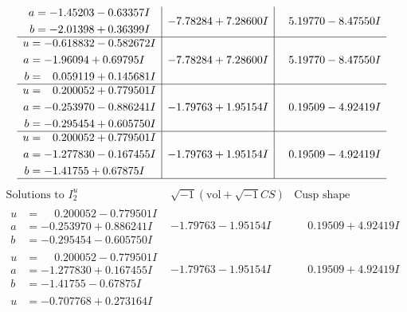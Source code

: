 \documentclass[1p]{elsarticle_modified}
\theoremstyle{definition}
\newcommand{\I}{\sqrt{-1}}
\begin{document}
$$\begin{array}{c|c|c}
\begin{aligned}
a &= -1.45203 - 0.63357 I \\
b &= -2.01398 + 0.36399 I\end{aligned}
 & -7.78284 + 7.28600 I & \phantom{-}5.19770 - 8.47550 I \\ \hline\begin{aligned}
u &= -0.618832 - 0.582672 I \\
a &= -1.96094 + 0.69795 I \\
b &= \phantom{-}0.059119 + 0.145681 I\end{aligned}
 & -7.78284 + 7.28600 I & \phantom{-}5.19770 - 8.47550 I \\ \hline\begin{aligned}
u &= \phantom{-}0.200052 + 0.779501 I \\
a &= -0.253970 - 0.886241 I \\
b &= -0.295454 + 0.605750 I\end{aligned}
 & -1.79763 + 1.95154 I & \phantom{-}0.19509 - 4.92419 I \\ \hline\begin{aligned}
u &= \phantom{-}0.200052 + 0.779501 I \\
a &= -1.277830 - 0.167455 I \\
b &= -1.41755 + 0.67875 I\end{aligned}
 & -1.79763 + 1.95154 I & \phantom{-}0.19509 - 4.92419 I\\
 \hline 
 \end{array}$$\newpage$$\begin{array}{c|c|c}  
\text{Solutions to }I^u_{2}& \I (\text{vol} + \sqrt{-1}CS) & \text{Cusp shape}\\
 \hline 
\begin{aligned}
u &= \phantom{-}0.200052 - 0.779501 I \\
a &= -0.253970 + 0.886241 I \\
b &= -0.295454 - 0.605750 I\end{aligned}
 & -1.79763 - 1.95154 I & \phantom{-}0.19509 + 4.92419 I \\ \hline\begin{aligned}
u &= \phantom{-}0.200052 - 0.779501 I \\
a &= -1.277830 + 0.167455 I \\
b &= -1.41755 - 0.67875 I\end{aligned}
 & -1.79763 - 1.95154 I & \phantom{-}0.19509 + 4.92419 I \\ \hline\begin{aligned}
u &= -0.707768 + 0.273164 I \\

\end{aligned}
\end{array}$$
\end{document}
